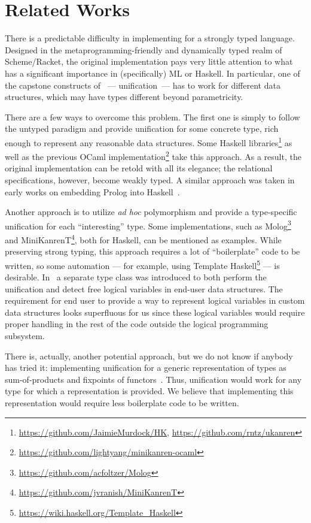 \section{Related Works}
\label{sec:relworks}

There is a predictable difficulty in implementing \miniKanren for a strongly typed language.
Designed in the metaprogramming-friendly and dynamically typed realm of Scheme/Racket, the original
\miniKanren implementation pays very little attention to what has a significant importance in (specifically)
ML or Haskell. In particular, one of the capstone constructs of \miniKanren~--- unification~--- has to work for
different data structures, which may have types different beyond parametricity.

There are a few ways to overcome this problem. The first one is simply to follow the untyped paradigm and
provide unification for some concrete type, rich enough to represent any reasonable data structures.
Some Haskell \miniKanren libraries\footnote{\url{https://github.com/JaimieMurdock/HK}, \url{https://github.com/rntz/ukanren}}
as well as the previous OCaml implementation\footnote{\url{https://github.com/lightyang/minikanren-ocaml}} take this approach.
As a result, the original implementation can be retold with all its elegance; the relational specifications, however,
become weakly typed. A similar approach was taken in early works on embedding Prolog into Haskell~\cite{PrologInHaskell}.

Another approach is to utilize \emph{ad hoc} polymorphism and provide a type-specific unification for each ``interesting'' type.
Some \miniKanren implementations, such as Molog\footnote{\url{https://github.com/acfoltzer/Molog}} and
MiniKanrenT\footnote{\url{https://github.com/jvranish/MiniKanrenT}}, both for Haskell, can be mentioned as examples.
While preserving strong typing, this approach requires a lot of ``boilerplate''
code to be written, so some automation --- for example, using Template Haskell\footnote{\url{https://wiki.haskell.org/Template_Haskell}} ---
is desirable. In~\cite{TypedLogicalVariables} a separate type class was introduced to both perform the unification
and detect free logical variables in end-user data structures. The requirement for end user to provide a way to represent
logical variables in custom data structures looks superfluous for us since these logical variables would require proper
handling in the rest of the code outside the logical programming subsystem.

There is, actually, another potential approach, but we do not know if anybody has tried
it: implementing unification for a generic representation of types as sum-of-products and fixpoints of
functors~\cite{InstantGenerics, ALaCarte}. Thus, unification would work for any type for which a representation
is provided. We believe that implementing this representation would require less boilerplate code to be written.

